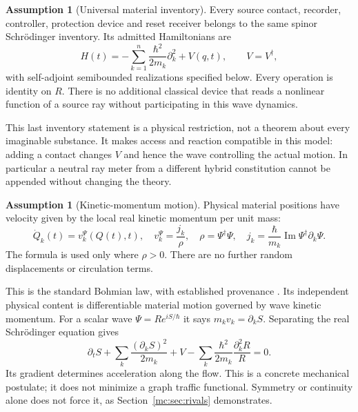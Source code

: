 \documentclass[11pt,oneside,openany]{book}
\theoremstyle{definition}
\newtheorem{assumption}[theorem]{Assumption}
\theoremstyle{remark}\newtheorem{remark}[theorem]{Remark}
\begin{document}
\begin{assumption}[Universal material inventory]\label{mc:ax:material}
Every source contact, recorder, controller, protection device and reset receiver belongs to the same spinor Schr\"odinger inventory. Its admitted Hamiltonians are
\begin{equation}\label{mc:eq:H}
 H(t)=-\sum_{k=1}^n\frac{\hbar^2}{2m_k}\partial_k^2+V(q,t),
 \qquad V=V^\dagger,
\end{equation}
with self-adjoint semibounded realizations specified below. Every operation is identity on $R$. There is no additional classical device that reads a nonlinear function of a source ray without participating in this wave dynamics.
\end{assumption}
This last inventory statement is a physical restriction, not a theorem about every imaginable substance. It makes access and reaction compatible in this model: adding a contact changes $V$ and hence the wave controlling the actual motion. In particular a neutral ray meter from a different hybrid constitution cannot be appended without changing the theory.

\begin{assumption}[Kinetic-momentum motion]\label{mc:ax:motion}
Physical material positions have velocity given by the local real kinetic momentum per unit mass:
\begin{equation}\label{mc:eq:guidance}
 \dot Q_k(t)=v_k^\Psi(Q(t),t),\quad
 v_k^\Psi=\frac{j_k}{\rho},\quad
 \rho=\Psi^\dagger\Psi,\quad
 j_k=\frac{\hbar}{m_k}\operatorname{Im}\Psi^\dagger\partial_k\Psi.
\end{equation}
The formula is used only where $\rho>0$. There are no further random displacements or circulation terms.
\end{assumption}
This is the standard Bohmian law, with established provenance \cite{mc:BohmI,mc:BohmII,mc:DGZoperators}. Its independent physical content is differentiable material motion governed by wave kinetic momentum. For a scalar wave $\Psi=Re^{iS/\hbar}$ it says $m_kv_k=\partial_kS$. Separating the real Schr\"odinger equation gives
\[
 \partial_tS+\sum_k\frac{(\partial_kS)^2}{2m_k}+V
 -\sum_k\frac{\hbar^2}{2m_k}\frac{\partial_k^2R}{R}=0.
\]
Its gradient determines acceleration along the flow. This is a concrete mechanical postulate; it does not minimize a graph traffic functional. Symmetry or continuity alone does not force it, as Section~\ref{mc:sec:rivals} demonstrates.
\end{document}
